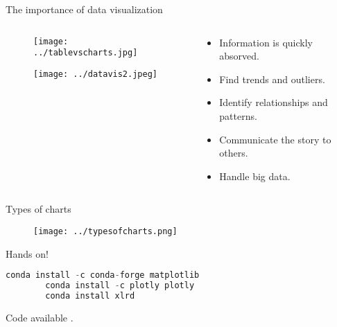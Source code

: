 \documentclass{beamer}
\begin{document}
\begin{frame}{The importance of data visualization}
 
\begin{columns}

\begin{column}[t]{0.55\textwidth}


  \begin{figure}
  \texttt{[image: ../tablevscharts.jpg]}
  \end{figure}
  \begin{figure}
  \texttt{[image: ../datavis2.jpeg]}
  \end{figure}

\end{column}

\begin{column}[t]{0.4\textwidth}

    \begin{itemize}[<+(1)->]

    \item Information is quickly absorved.
    \item Find trends and outliers.
    \item Identify relationships and patterns.
    \item Communicate the story to others.
    \item Handle big data.


    \end{itemize}

\end{column}

\end{columns}
  
\end{frame}


\begin{frame}{Types of charts}

  \begin{figure}
  \texttt{[image: ../typesofcharts.png]}
  \end{figure}
  
\end{frame}


\begin{frame}[fragile]{Hands on!}

        \begin{lstlisting}[language= Python, frame = single, title={Packages to install}]
        conda install -c conda-forge matplotlib 
        conda install -c plotly plotly 
        conda install xlrd
        \end{lstlisting}

        Code available \href{https://github.com/saulomeirelles/WomenInPython/tree/master/dataViz}{\color{green}{here}}.
        
\end{frame}
\end{document}

